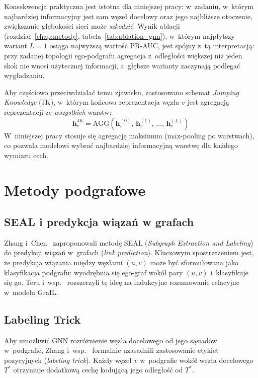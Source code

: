 \documentclass{SGGW-thesis}
\begin{document}
Konsekwencja praktyczna jest istotna dla niniejszej pracy: w~zadaniu, w~którym najbardziej
informacyjny jest sam węzeł docelowy oraz jego najbliższe otoczenie, zwiększanie głębokości sieci
może \textit{szkodzić}. Wynik ablacji (rozdział~\ref{chap:metody}, tabela~\ref{tab:ablation_gnn}),
w~którym najpłytszy wariant $L{=}1$ osiąga najwyższą wartość PR-AUC, jest spójny z~tą interpretacją:
przy zadanej topologii ego-podgrafu agregacja z~odległości większej niż jeden skok nie wnosi
użytecznej informacji, a~głębsze warianty zaczynają podlegać wygładzaniu.

Aby częściowo przeciwdziałać temu zjawisku, zastosowano schemat \textit{Jumping Knowledge} (JK),
w~którym końcowa reprezentacja węzła $v$ jest agregacją reprezentacji ze \textit{wszystkich} warstw:
\begin{equation}
    \mathbf{h}_v^{\mathrm{JK}} = \mathrm{AGG}\!\left(\mathbf{h}_v^{(0)},\, \mathbf{h}_v^{(1)},\, \ldots,\, \mathbf{h}_v^{(L)}\right)
    \label{eq:jk}
\end{equation}
W~niniejszej pracy stosuje się agregację maksimum (max-pooling po warstwach), co pozwala modelowi
wybrać najbardziej informacyjną warstwę dla każdego wymiaru cech.

\section{Metody podgrafowe}

\subsection{SEAL i predykcja wiązań w grafach}

Zhang i~Chen~\cite{zhang2018seal} zaproponowali metodę SEAL (\textit{Subgraph Extraction and Labeling})
do predykcji wiązań w~grafach (\textit{link prediction}). Kluczowym spostrzeżeniem jest, że predykcja
wiązania między węzłami $(u, v)$ może być sformułowana jako klasyfikacja podgrafu: wyodrębnia się
ego-graf wokół pary $(u, v)$ i~klasyfikuje się go. Teru i~wsp.~\cite{teru2020} rozszerzyli tę ideę
na indukcyjne rozumowanie relacyjne w~modelu GraIL.

\subsection{Labeling Trick}

Aby umożliwić GNN rozróżnienie węzła docelowego od jego sąsiadów w~podgrafie, Zhang i~wsp.~\cite{zhang2021labeling}
formalnie uzasadnili zastosowanie etykiet pozycyjnych (\textit{labeling trick}). Każdy węzeł $v$
w~podgrafie wokół węzła docelowego $T^*$ otrzymuje dodatkową cechę kodującą jego odległość od $T^*$.
\end{document}
